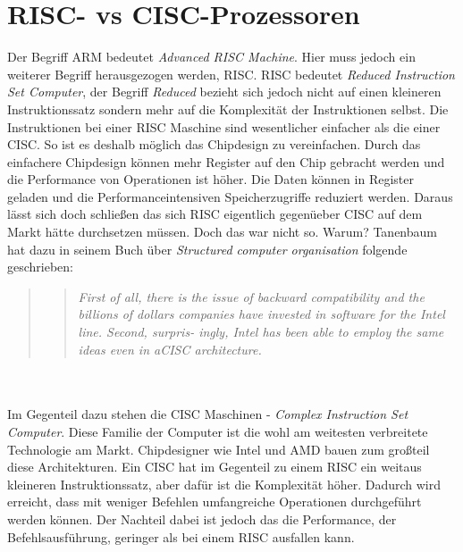 \section{RISC- vs CISC-Prozessoren}
Der Begriff ARM bedeutet \textit{Advanced RISC Machine}. Hier muss jedoch ein weiterer Begriff herausgezogen werden, RISC. RISC bedeutet \textit{Reduced Instruction Set Computer}, der Begriff \textit{Reduced} bezieht sich jedoch nicht auf einen kleineren Instruktionssatz sondern mehr auf die Komplexit\"at der Instruktionen selbst. Die Instruktionen bei einer RISC Maschine sind wesentlicher einfacher als die einer CISC. So ist es deshalb m\"oglich das Chipdesign zu vereinfachen. Durch das einfachere Chipdesign k\"onnen mehr Register auf den Chip gebracht werden und die Performance von Operationen ist h\"oher. Die Daten k\"onnen in  Register geladen und die Performanceintensiven Speicherzugriffe reduziert werden. Daraus l\"asst sich doch schlie\ss en das sich RISC eigentlich gegen\"ueber CISC auf dem Markt h\"atte durchsetzen m\"ussen. Doch das war nicht so. Warum? Tanenbaum hat dazu in seinem Buch \"uber \textit{Structured computer organisation} folgende geschrieben: 
\begin{quote}
\blockquote{\textit{First of all, there is the issue of backward compatibility and the billions of
dollars companies have invested in software for the Intel line. Second, surpris-
ingly, Intel has been able to employ the same ideas even in aCISC architecture.}}
\end{quote}\parencite[80]{tane:sco} \\\\
Im Gegenteil dazu stehen die CISC Maschinen - \textit{Complex Instruction Set Computer}. Diese Familie der Computer ist die wohl am weitesten verbreitete Technologie am Markt. Chipdesigner wie Intel und AMD bauen zum gro\ss teil diese Architekturen. Ein CISC hat im Gegenteil zu einem RISC ein weitaus kleineren Instruktionssatz, aber daf\"ur ist die Komplexit\"at h\"oher. Dadurch wird erreicht, dass mit weniger Befehlen umfangreiche Operationen durchgef\"uhrt werden k\"onnen. Der Nachteil dabei ist jedoch das die Performance, der Befehlsausf\"uhrung, geringer als bei einem RISC ausfallen kann.
